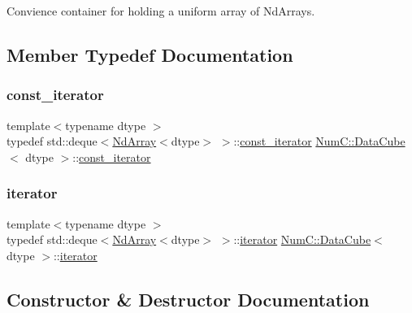 Convience container for holding a uniform array of Nd\+Arrays. 

\subsection{Member Typedef Documentation}
\mbox{\label{class_num_c_1_1_data_cube_afb6045a628e0587b3343da1dda12fa03}} 
\subsubsection{\texorpdfstring{const\+\_\+iterator}{const\_iterator}}
{\footnotesize\ttfamily template$<$typename dtype $>$ \\
typedef std\+::deque$<$\mbox{\hyperlink{class_num_c_1_1_nd_array}{Nd\+Array}}$<$dtype$>$ $>$\+::\mbox{\hyperlink{class_num_c_1_1_data_cube_afb6045a628e0587b3343da1dda12fa03}{const\+\_\+iterator}} \mbox{\hyperlink{class_num_c_1_1_data_cube}{Num\+C\+::\+Data\+Cube}}$<$ dtype $>$\+::\mbox{\hyperlink{class_num_c_1_1_data_cube_afb6045a628e0587b3343da1dda12fa03}{const\+\_\+iterator}}}

\mbox{\label{class_num_c_1_1_data_cube_aa3703e7574db61a4e1ef4b8db93db86a}} 
\subsubsection{\texorpdfstring{iterator}{iterator}}
{\footnotesize\ttfamily template$<$typename dtype $>$ \\
typedef std\+::deque$<$\mbox{\hyperlink{class_num_c_1_1_nd_array}{Nd\+Array}}$<$dtype$>$ $>$\+::\mbox{\hyperlink{class_num_c_1_1_data_cube_aa3703e7574db61a4e1ef4b8db93db86a}{iterator}} \mbox{\hyperlink{class_num_c_1_1_data_cube}{Num\+C\+::\+Data\+Cube}}$<$ dtype $>$\+::\mbox{\hyperlink{class_num_c_1_1_data_cube_aa3703e7574db61a4e1ef4b8db93db86a}{iterator}}}



\subsection{Constructor \& Destructor Documentation}
\mbox{\label{class_num_c_1_1_data_cube_ab60b5ccabf8953eee271f4064d80f708}} 
